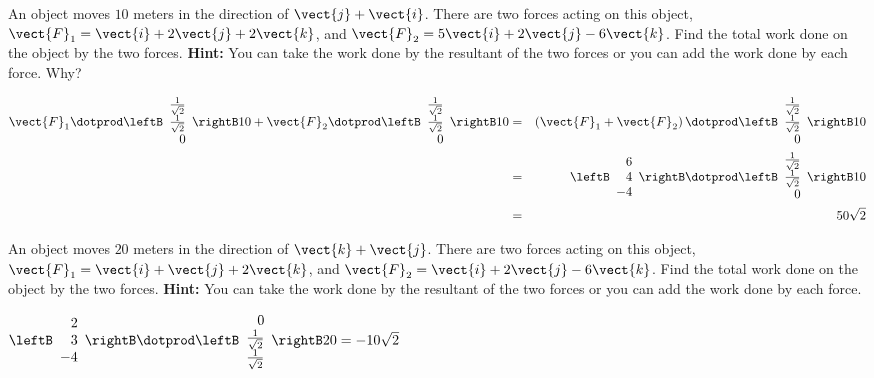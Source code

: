 \begin{enumialphparenastyle}
\begin{ex} An object moves $10$ meters in the direction of $\vect{j}+\vect{i}$. There
are two forces acting on this object, $\vect{F}_{1}=\vect{i}+2\vect{j}
+2\vect{k}$, and $\vect{F}_{2}=5\vect{i}+2\vect{j}-6\vect{k}$.
Find the total work done on the object by the two forces. \textbf{Hint: }You
can take the work done by the resultant of the two forces or you can add the
work done by each force. Why?
\begin{sol}
\begin{eqnarray*}
\vect{F}_{1}\dotprod \leftB \begin{array}{r}
 \frac{1}{\sqrt{2}} \\
\frac{1}{\sqrt{2}} \\
0
\end{array}
\rightB 10+\vect{F}_{2}\dotprod  \leftB \begin{array}{r}
 \frac{1}{\sqrt{2}} \\
 \frac{1}{\sqrt{2}} \\
 0
\end{array}
\rightB 10 &=&\left( \vect{F}_{1}+\vect{F}_{2}\right)
\dotprod \leftB \begin{array}{r}
 \frac{1}{\sqrt{2}} \\
 \frac{1}{\sqrt{2}} \\
 0
\end{array}
\rightB 10 \\
&=& \leftB \begin{array}{r}
6 \\
4 \\
 -4
\end{array}
\rightB \dotprod \leftB \begin{array}{r}
 \frac{1}{\sqrt{2}} \\
 \frac{1}{\sqrt{2}} \\
 0
\end{array}
\rightB
10 \\
&=& 50\sqrt{2}
\end{eqnarray*}
\end{sol}
\end{ex}

\begin{ex} An object moves $20$ meters in the direction of $\vect{k}+\vect{j}$. There
are two forces acting on this object, $\vect{F}_{1}=\vect{i}+\vect{j}+
2\vect{k}$, and $\vect{F}_{2}=\vect{i}+2\vect{j}-6\vect{k}$. Find
the total work done on the object by the two forces. \textbf{Hint: }You can
take the work done by the resultant of the two forces or you can add the
work done by each force.
\begin{sol}
$\leftB \begin{array}{r}
2 \\
3 \\
-4
\end{array}
\rightB \dotprod \leftB \begin{array}{r}
0 \\
 \frac{1}{\sqrt{2}} \\
 \frac{1}{\sqrt{2}} 
\end{array}
\rightB 20= -10\sqrt{2}$
\end{sol}
\end{ex}

\end{enumialphparenastyle}
